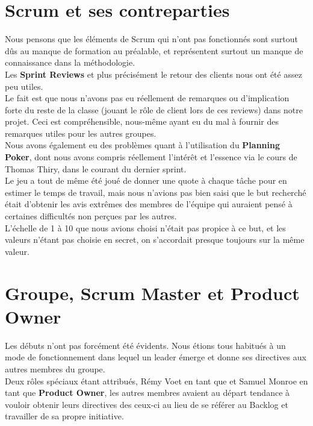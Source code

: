 \documentclass{report}
\begin{document}
	\section{Scrum et ses contreparties}

		Nous pensons que les éléments de Scrum qui n'ont pas fonctionnés sont surtout dûs au manque de formation au préalable, et représentent surtout un manque de connaissance dans la méthodologie.\\

		Les \textbf{Sprint Reviews} et plus précisément le retour des clients nous ont été assez peu utiles.\\
		Le fait est que nous n'avons pas eu réellement de remarques ou d'implication forte du reste de la classe (jouant le rôle de client lors de ces reviews) dans notre projet. Ceci est compréhensible, nous-même ayant eu du mal à fournir des remarques utiles pour les autres groupes.\\

		Nous avons également eu des problèmes quant à l'utilisation du \textbf{Planning Poker}, dont nous avons compris réellement l'intérêt et l'essence via le cours de Thomas Thiry, dans le courant du dernier sprint.\\
		Le jeu a tout de même été joué de donner une quote à chaque tâche pour en estimer le temps de travail, mais nous n'avions pas bien saisi que le but recherché était d'obtenir les avis extrêmes des membres de l'équipe qui auraient pensé à certaines difficultés non perçues par les autres.\\
		L'échelle de 1 à 10 que nous avions choisi n'était pas propice à ce but, et les valeurs n'étant pas choisie en secret, on s'accordait presque toujours sur la même valeur.\\

	\section{Groupe, Scrum Master et Product Owner}

		Les débuts n'ont pas forcément été évidents. Nous étions tous habitués à un mode de fonctionnement dans lequel un leader émerge et donne ses directives aux autres membres du groupe.\\
		Deux rôles spéciaux étant attribués, Rémy Voet en tant que  et Samuel Monroe en tant que \textbf{Product Owner}, les autres membres avaient au départ tendance à vouloir obtenir leurs directives des ceux-ci au lieu de se référer au Backlog et travailler de sa propre initiative.\\
\end{document}
